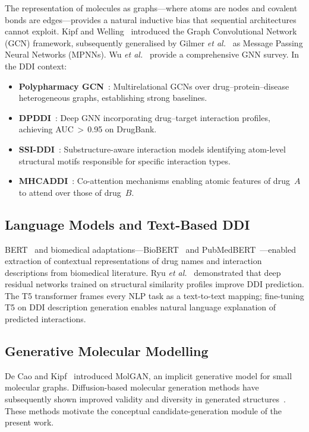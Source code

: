 \documentclass[conference]{IEEEtran}
\begin{document}
The representation of molecules as graphs---where atoms are nodes and covalent bonds are
edges---provides a natural inductive bias that sequential architectures cannot exploit.
Kipf and Welling~\cite{kipf2016semi} introduced the Graph Convolutional Network (GCN)
framework, subsequently generalised by Gilmer \textit{et al.}~\cite{gilmer2017mpnn}
as Message Passing Neural Networks (MPNNs). Wu \textit{et al.}~\cite{wu2021survey}
provide a comprehensive GNN survey. In the DDI context:
\begin{itemize}
  \item \textbf{Polypharmacy GCN}~\cite{zitnik2018polypharmacy}: Multirelational GCNs
  over drug--protein--disease heterogeneous graphs, establishing strong baselines.
  \item \textbf{DPDDI}~\cite{feng2020dpddi}: Deep GNN incorporating drug--target
  interaction profiles, achieving AUC\,$>$\,0.95 on DrugBank.
  \item \textbf{SSI-DDI}~\cite{jaeger2018mol2vec}: Substructure-aware interaction
  models identifying atom-level structural motifs responsible for specific interaction types.
  \item \textbf{MHCADDI}~\cite{deac2019drug}: Co-attention mechanisms enabling atomic
  features of drug~$A$ to attend over those of drug~$B$.
\end{itemize}

\subsection{Language Models and Text-Based DDI}

BERT~\cite{devlin2018bert} and biomedical adaptations---BioBERT~\cite{lee2020biobert} and
PubMedBERT~\cite{gu2021pubmedbert}---enabled extraction of contextual representations of
drug names and interaction descriptions from biomedical literature. Ryu
\textit{et al.}~\cite{ryu2018deepddi} demonstrated that deep residual networks trained on
structural similarity profiles improve DDI prediction. The T5 transformer
\cite{raffel2020t5} frames every NLP task as a text-to-text mapping; fine-tuning T5 on DDI
description generation enables natural language explanation of predicted interactions.

\subsection{Generative Molecular Modelling}

De Cao and Kipf~\cite{decao2018molgan} introduced MolGAN, an implicit generative model
for small molecular graphs. Diffusion-based molecular generation methods have subsequently
shown improved validity and diversity in generated structures~\cite{hoogeboom2022edm}.
These methods motivate the conceptual candidate-generation module of the present work.
\end{document}
